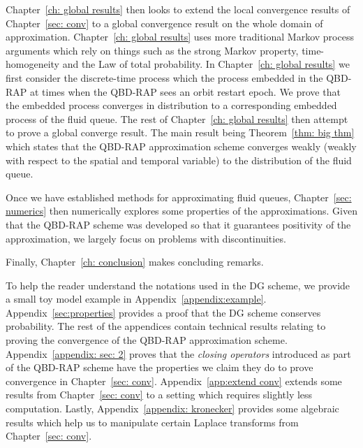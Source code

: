 Chapter~\ref{ch: global results} then looks to extend the local convergence results of Chapter~\ref{sec: conv} to a global convergence result on the whole domain of approximation. Chapter~\ref{ch: global results} uses more traditional Markov process arguments which rely on things such as the strong Markov property, time-homogeneity and the Law of total probability. In Chapter~\ref{ch: global results} we first consider the discrete-time process which the process embedded in the QBD-RAP at times when the QBD-RAP sees an orbit restart epoch. We prove that the embedded process converges in distribution to a corresponding embedded process of the fluid queue. The rest of Chapter~\ref{ch: global results} then attempt to prove a global converge result. The main result being Theorem~\ref{thm: big thm} which states that the QBD-RAP approximation scheme converges weakly (weakly with respect to the spatial and temporal variable) to the distribution of the fluid queue. 

Once we have established methods for approximating fluid queues, Chapter~\ref{sec: numerics} then numerically explores some properties of the approximations. Given that the QBD-RAP scheme was developed so that it guarantees positivity of the approximation, we largely focus on problems with discontinuities. 

Finally, Chapter~\ref{ch: conclusion} makes concluding remarks. 

To help the reader understand the notations used in the DG scheme, we provide a small toy model example in Appendix~\ref{appendix:example}. Appendix~\ref{sec:properties} provides a proof that the DG scheme conserves probability. The rest of the appendices contain technical results relating to proving the convergence of the QBD-RAP approximation scheme. Appendix~\ref{appendix: sec: 2} proves that the \emph{closing operators} introduced as part of the QBD-RAP scheme have the properties we claim they do to prove convergence in Chapter~\ref{sec: conv}. Appendix~\ref{app:extend conv} extends some results from Chapter~\ref{sec: conv} to a setting which requires slightly less computation. Lastly, Appendix~\ref{appendix: kronecker} provides some algebraic results which help us to manipulate certain Laplace transforms from Chapter~\ref{sec: conv}.
